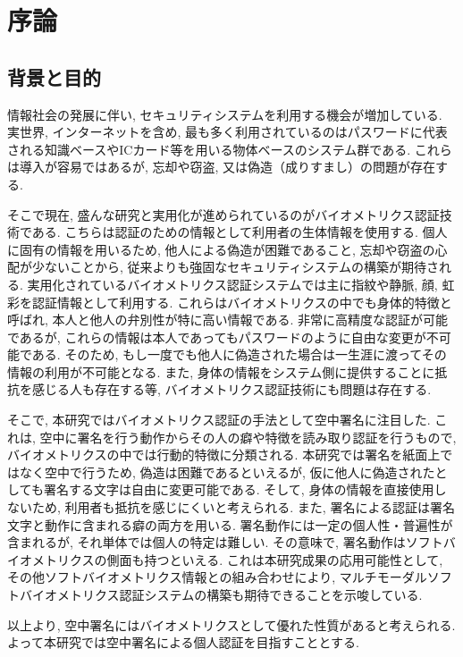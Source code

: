 \chapter{序論}\label{abst}
\section{背景と目的}

情報社会の発展に伴い, セキュリティシステムを利用する機会が増加している. 実世界, インターネットを含め, 最も多く利用されているのはパスワードに代表される知識ベースやICカード等を用いる物体ベースのシステム群である. これらは導入が容易ではあるが, 忘却や窃盗, 又は偽造（成りすまし）の問題が存在する\cite{cite_1}.

そこで現在, 盛んな研究と実用化が進められているのがバイオメトリクス認証技術である. こちらは認証のための情報として利用者の生体情報を使用する. 個人に固有の情報を用いるため, 他人による偽造が困難であること, 忘却や窃盗の心配が少ないことから, 従来よりも強固なセキュリティシステムの構築が期待される. 実用化されているバイオメトリクス認証システムでは主に指紋や静脈, 顔, 虹彩を認証情報として利用する\cite{cite_1}. これらはバイオメトリクスの中でも身体的特徴と呼ばれ, 本人と他人の弁別性が特に高い情報である. 非常に高精度な認証が可能であるが, これらの情報は本人であってもパスワードのように自由な変更が不可能である. そのため, もし一度でも他人に偽造された場合は一生涯に渡ってその情報の利用が不可能となる. また, 身体の情報をシステム側に提供することに抵抗を感じる人も存在する等, バイオメトリクス認証技術にも問題は存在する.

そこで, 本研究ではバイオメトリクス認証の手法として空中署名に注目した. これは, 空中に署名を行う動作からその人の癖や特徴を読み取り認証を行うもので, バイオメトリクスの中では行動的特徴に分類される. 本研究では署名を紙面上ではなく空中で行うため, 偽造は困難であるといえるが, 仮に他人に偽造されたとしても署名する文字は自由に変更可能である. そして, 身体の情報を直接使用しないため, 利用者も抵抗を感じにくいと考えられる. また, 署名による認証は署名文字と動作に含まれる癖の両方を用いる. 署名動作には一定の個人性・普遍性が含まれるが, それ単体では個人の特定は難しい. その意味で, 署名動作はソフトバイオメトリクスの側面も持つといえる. これは本研究成果の応用可能性として, その他ソフトバイオメトリクス情報との組み合わせにより, マルチモーダルソフトバイオメトリクス認証システムの構築も期待できることを示唆している.

以上より, 空中署名にはバイオメトリクスとして優れた性質があると考えられる. よって本研究では空中署名による個人認証を目指すこととする.


